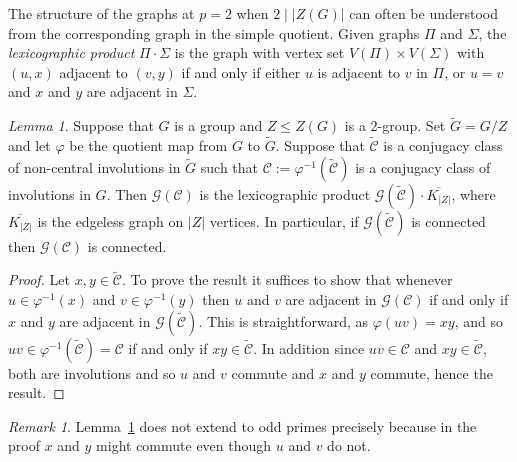 \documentclass[11pt,a4paper]{amsart}
\theoremstyle{plain}
\theoremstyle{definition}
\theoremstyle{remark}
\newtheorem{remark}[definition]{Remark}
\newtheorem{lemma}[definition]{Lemma}
\theoremstyle{remark}
\theoremstyle{remark}
\theoremstyle{definition}
\newcommand{\GG}{\mathcal{G}}
\begin{document}
The structure of the graphs at $p=2$ when $2\mid |Z(G)|$ can often be understood from the corresponding graph in the simple quotient. Given graphs $\Pi$ and $\Sigma$, the \emph{lexicographic product} $\Pi\cdot\Sigma$ is the graph with vertex set $V(\Pi)\times V(\Sigma)$ with $(u,x)$ adjacent to $(v,y)$ if and only if either $u$ is adjacent to $v$ in $\Pi$, or $u=v$ and $x$ and $y$ are adjacent in $\Sigma$.


\begin{lemma}\label{lem:coversingleclass} Suppose that $G$ is a group and $Z \le Z(G)$ is a $2$-group. Set $\widetilde{G}=G/Z$ and let $\varphi$ be the quotient map from $G$ to $\widetilde{G}$. Suppose that $\widetilde{\mathcal{C}}$ is a conjugacy class of non-central involutions in $\widetilde G$ such that $\mathcal{C}:=\varphi^{-1}(\widetilde{\mathcal{C}})$ is  a conjugacy class of involutions in $G$. Then $\GG(\mathcal{C})$ is the lexicographic product $\GG(\widetilde{\mathcal{C}})\cdot \overline{K_{|Z|}}$, where $\overline{K_{|Z|}}$ is the edgeless graph on $|Z|$ vertices. In particular, if $\GG(\widetilde{\mathcal{C}})$ is connected then $\GG(\mathcal{C})$ is connected.
\end{lemma}
\begin{proof} Let $x,y\in\widetilde{\mathcal{C}}$. To prove the result it suffices to show that whenever $u\in\varphi^{-1}(x)$ and $v\in\varphi^{-1}(y)$ then $u$ and $v$ are adjacent in $\GG(\mathcal{C})$ if and only if $x$ and $y$ are adjacent in $\GG(\widetilde{\mathcal{C}})$. This is straightforward, as $\varphi(uv)=xy$, and so $uv\in\varphi^{-1}(\widetilde{\mathcal{C}})=\mathcal{C}$ if and only if $xy\in\widetilde{\mathcal{C}}$. In addition since $uv\in\mathcal{C}$ and $xy\in \widetilde{\mathcal{C}}$, both are involutions and so $u$ and $v$ commute and $x$ and $y$ commute, hence the result.
\end{proof}

\medskip

\begin{remark} Lemma~\ref{lem:coversingleclass} does not extend to odd primes precisely because in the proof $x$ and $y$ might commute even though $u$ and $v$ do not.
\end{remark}
\end{document}
